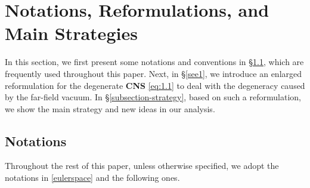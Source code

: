\documentclass[11pt,reqno]{amsart}
\numberwithin{rk}{section}
\numberwithin{prop}{section}
\numberwithin{mydef}{section}
\numberwithin{lem}{section}
\numberwithin{equation}{section}
\numberwithin{thm}{section}
\begin{document}
\section{Notations, Reformulations, and Main Strategies}\label{Section2}
In this section, we first present some notations and conventions in \S\ref{section-notaions}, which are frequently used throughout this paper. Next, in \S\ref{see1}, we introduce an enlarged reformulation for the degenerate \textbf{CNS} \eqref{eq:1.1}   to deal with the degeneracy caused by the far-field vacuum. In \S\ref{subsection-strategy}, based on such a reformulation,  we show the main strategy and new ideas in our analysis.  

\subsection{Notations}\label{section-notaions}
Throughout the rest of this paper, 
unless otherwise specified, we adopt the notations in \eqref{eulerspace} and the following ones.
\end{document}
